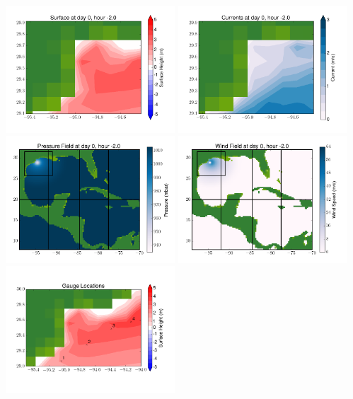 \documentclass[11pt]{article}
\begin{document}
\includegraphics[width=0.475\textwidth]{frame0070fig6.png}
\vskip 10pt 
\includegraphics[width=0.475\textwidth]{frame0070fig7.png}
\includegraphics[width=0.475\textwidth]{frame0070fig8.png}
\vskip 10pt 
\includegraphics[width=0.475\textwidth]{frame0070fig9.png}
\includegraphics[width=0.475\textwidth]{frame0070fig10.png}
\end{document}

